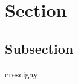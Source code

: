\documentclass{article}
\begin{document}
\section{Section}
\subsection{Subsection}
crescigay
\end{document}
